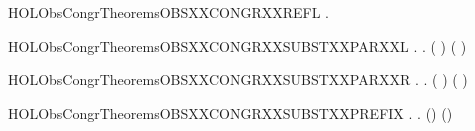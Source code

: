 \newcommand{\HOLObsCongrTheoremsOBSXXCONGRXXPRESDXXBYXXSUM}{\UseVerbatim{HOLObsCongrTheoremsOBSXXCONGRXXPRESDXXBYXXSUM}}
\begin{SaveVerbatim}{HOLObsCongrTheoremsOBSXXCONGRXXREFL}
\HOLTokenTurnstile{} \HOLSymConst{\HOLTokenForall{}}.   
\end{SaveVerbatim}
\newcommand{\HOLObsCongrTheoremsOBSXXCONGRXXREFL}{\UseVerbatim{HOLObsCongrTheoremsOBSXXCONGRXXREFL}}
\begin{SaveVerbatim}{HOLObsCongrTheoremsOBSXXCONGRXXSUBSTXXPARXXL}
\HOLTokenTurnstile{} \HOLSymConst{\HOLTokenForall{}} .    \HOLSymConst{\HOLTokenImp{}} \HOLSymConst{\HOLTokenForall{}}.  ( \HOLSymConst{\ensuremath{\parallel}} ) ( \HOLSymConst{\ensuremath{\parallel}} )
\end{SaveVerbatim}
\newcommand{\HOLObsCongrTheoremsOBSXXCONGRXXSUBSTXXPARXXL}{\UseVerbatim{HOLObsCongrTheoremsOBSXXCONGRXXSUBSTXXPARXXL}}
\begin{SaveVerbatim}{HOLObsCongrTheoremsOBSXXCONGRXXSUBSTXXPARXXR}
\HOLTokenTurnstile{} \HOLSymConst{\HOLTokenForall{}} .    \HOLSymConst{\HOLTokenImp{}} \HOLSymConst{\HOLTokenForall{}}.  ( \HOLSymConst{\ensuremath{\parallel}} ) ( \HOLSymConst{\ensuremath{\parallel}} )
\end{SaveVerbatim}
\newcommand{\HOLObsCongrTheoremsOBSXXCONGRXXSUBSTXXPARXXR}{\UseVerbatim{HOLObsCongrTheoremsOBSXXCONGRXXSUBSTXXPARXXR}}
\begin{SaveVerbatim}{HOLObsCongrTheoremsOBSXXCONGRXXSUBSTXXPREFIX}
\HOLTokenTurnstile{} \HOLSymConst{\HOLTokenForall{}} .    \HOLSymConst{\HOLTokenImp{}} \HOLSymConst{\HOLTokenForall{}}.  () ()
\end{SaveVerbatim}
\newcommand{\HOLObsCongrTheoremsOBSXXCONGRXXSUBSTXXPREFIX}{\UseVerbatim{HOLObsCongrTheoremsOBSXXCONGRXXSUBSTXXPREFIX}}
